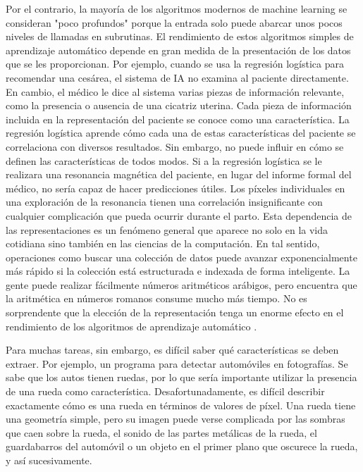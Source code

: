 	
	Por el contrario, la mayoría de los algoritmos modernos de machine learning se consideran "poco profundos" porque la entrada solo puede abarcar unos pocos niveles de llamadas en subrutinas. El rendimiento de estos algoritmos simples de aprendizaje automático depende en gran medida de la presentación de los datos que se les proporcionan. Por ejemplo, cuando se usa la regresión logística para recomendar una cesárea, el sistema de IA no examina al paciente directamente. En cambio, el médico le dice al sistema varias piezas de información relevante, como la presencia o ausencia de una cicatriz uterina. Cada pieza de información incluida en la representación del paciente se conoce como una característica. La regresión logística aprende cómo cada una de estas características del paciente se correlaciona con diversos resultados. Sin embargo, no puede influir en cómo se definen las características de todos modos. Si a la regresión logística se le realizara una resonancia magnética del paciente, en lugar del informe formal del médico, no sería capaz de hacer predicciones útiles. Los píxeles individuales en una exploración de la resonancia tienen una correlación insignificante con cualquier complicación que pueda ocurrir durante el parto. Esta dependencia de las representaciones es un fenómeno general que aparece no solo en la vida cotidiana sino también en las ciencias de la computación. En tal sentido, operaciones como buscar una colección de datos puede avanzar exponencialmente más rápido si la colección está estructurada e indexada de forma inteligente. La gente puede realizar fácilmente números aritméticos arábigos, pero encuentra que la aritmética en números romanos consume mucho más tiempo. No es sorprendente que la elección de la representación tenga un enorme efecto en el rendimiento de los algoritmos de aprendizaje automático \citep{Goodfellow-et-al-2016}.

	
	Para muchas tareas, sin embargo, es difícil saber qué características se deben extraer. Por ejemplo, un programa para detectar automóviles en fotografías. Se sabe que los autos tienen ruedas, por lo que sería importante utilizar la presencia de una rueda como característica. Desafortunadamente, es difícil describir exactamente cómo es una rueda en términos de valores de píxel. Una rueda tiene una geometría simple, pero su imagen puede verse complicada por las sombras que caen sobre la rueda, el sonido de las partes metálicas de la rueda, el guardabarros del automóvil o un objeto en el primer plano que oscurece la rueda, y así sucesivamente. 

